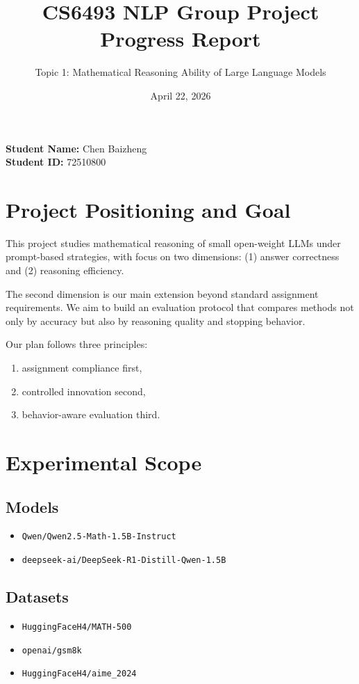 \documentclass[11pt]{article}
\title{CS6493 NLP Group Project Progress Report}
\author{Topic 1: Mathematical Reasoning Ability of Large Language Models}
\date{April 22, 2026}
\begin{document}
\maketitle

\textbf{Student Name:} Chen Baizheng \\
\textbf{Student ID:} 72510800

\section{Project Positioning and Goal}

This project studies mathematical reasoning of small open-weight LLMs under prompt-based strategies, with focus on two dimensions: (1) answer correctness and (2) reasoning efficiency.

The second dimension is our main extension beyond standard assignment requirements. We aim to build an evaluation protocol that compares methods not only by accuracy but also by reasoning quality and stopping behavior.

Our plan follows three principles:
\begin{enumerate}[leftmargin=*]
    \item assignment compliance first,
    \item controlled innovation second,
    \item behavior-aware evaluation third.
\end{enumerate}

\section{Experimental Scope}

\subsection{Models}
\begin{itemize}[leftmargin=*]
    \item \texttt{Qwen/Qwen2.5-Math-1.5B-Instruct}
    \item \texttt{deepseek-ai/DeepSeek-R1-Distill-Qwen-1.5B}
\end{itemize}

\subsection{Datasets}
\begin{itemize}[leftmargin=*]
    \item \texttt{HuggingFaceH4/MATH-500}
    \item \texttt{openai/gsm8k}
    \item \texttt{HuggingFaceH4/aime\_2024}
\end{itemize}
\end{document}
